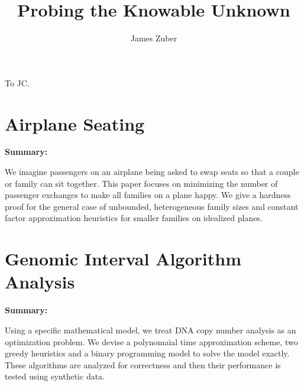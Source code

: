 \documentclass[phd,tbottom,tnosig]{Athesis}
\author{James Zuber}%
\title{Probing the Knowable Unknown}%
\begin{document}
\singlespacing %

\makeapproval %

\begin{abstract}

\end{abstract}

\begin{dedication}
  To JC.
\end{dedication}

\tableofcontents %

\pagestyle{thesis}



\newpage
{}

\chapter{Airplane Seating}{

\begin{centering}
\par{\large \bf Summary:}

\end{centering}

\par{We imagine passengers on an airplane being asked to swap seats so that a couple or family can sit together. This paper focuses on minimizing the number of passenger exchanges to make all families on a plane happy. We give a hardness proof for the general case of unbounded, heterogeneous family sizes and constant factor approximation heuristics for smaller families on idealized planes.} 
}


\chapter{Genomic Interval Algorithm Analysis}{


\begin{centering}
\par{\large \bf Summary:}

\end{centering}

\par{Using a specific mathematical model, we treat DNA copy number analysis as an optimization problem. We devise a polynomaial time approximation scheme, two greedy heuristics and a binary programming model to solve the model exactly. These algorithms are analyzed for correctness and then their performance is tested using synthetic data.} 
}

\end{document}
